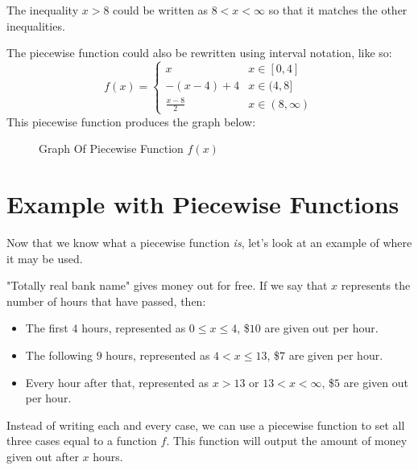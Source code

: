 The inequality $x > 8$ could be written as $8 < x < \infty$ so that it matches the other inequalities.

The piecewise function could also be rewritten using interval notation, like so:
\[
f(x) = 
\begin{cases}
    x & x \in [0, 4]\\
    -(x - 4) + 4 & x \in (4, 8] \\
    \frac{x - 8}{2} & x \in (8, \infty)
\end{cases}
\]
\clearpage
This piecewise function produces the graph below:
\begin{figure}[ht]
    \centering
    \caption{Graph Of Piecewise Function $f(x)$}
    \label{fig:Piecewise Example 1}
\end{figure}
\section{Example with Piecewise Functions}
Now that we know what a piecewise function \textit{is}, let's look at an example of where it may be used.

"Totally real bank name" gives money out for free. If we say that $x$ represents the number of hours that have passed, then:
\begin{itemize}
    \item The first $4$ hours, represented as $0 \le x \le 4$, \$$10$ are given out per hour.
    \item The following $9$ hours, represented as $4 < x \le 13$, \$$7$ are given per hour.
    \item Every hour after that, represented as $x > 13$ or $13 < x < \infty$, \$$5$ are given out per hour.
\end{itemize}
Instead of writing each and every case, we can use a piecewise function to set all three cases equal to a function $f$. This function will output the amount of money given out after $x$ hours.
\clearpage
